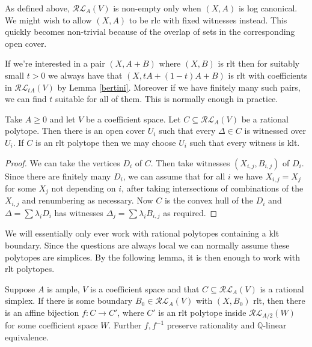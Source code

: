 	
	\begin{remark}
		
		As defined above, $\mathcal{RL}_{A}(V)$ is non-empty only when $(X,A)$ is log canonical. We might wish to allow $(X,A)$ to be rlc with fixed witnesses instead. This quickly becomes non-trivial because of the overlap of sets in the corresponding open cover.
		
		If we're interested in a pair $(X,A+B)$ where $(X,B)$ is rlt then for suitably small $t>0$ we always have that $(X,tA+(1-t)A+B)$ is rlt with coefficients in $\mathcal{RL}_{tA}(V)$ by Lemma \ref{bertini}. Moreover if we have finitely many such pairs, we can find $t$ suitable for all of them. This is normally enough in practice.
		
	\end{remark}
	
	\begin{lemma}
		Take $A \geq 0$ and let $V$ be a coefficient space. Let $C \subseteq \mathcal{RL}_{A}(V)$ be a rational polytope. Then there is an open cover $U_{i}$ such that every $\Delta \in C$ is witnessed over $U_{i}$. If $C$ is an rlt polytope then we may choose $U_{i}$ such that every witness is klt.
	\end{lemma}
	\begin{proof}
		We can take the vertices $D_{i}$ of $C$. Then take witnesses $(X_{i,j}, B_{i,j})$ of $D_{i}$. Since there are finitely many $D_{i}$, we can assume that for all $i$ we have $X_{i,j}=X_{j}$ for some $X_{j}$ not depending on $i$, after taking intersections of combinations of the $X_{i,j}$ and renumbering as necessary. Now $C$ is the convex hull of the $D_{i}$ and $\Delta= \sum \lambda_{i}D_{i}$ has witnesses $\Delta_{j}= \sum \lambda_{i}B_{i,j}$ as required.
	\end{proof}
	
	We will essentially only ever work with rational polytopes containing a klt boundary. Since the questions are always local we can normally assume these polytopes are simplices. By the following lemma, it is then enough to work with rlt polytopes.
	
	\begin{lemma}\label{rlt-repl}
		Suppose $A$ is ample, $V$ is a coefficient space and that $C\subseteq \mathcal{RL}_{A}(V)$ is a rational simplex. If there is some boundary $B_{0} \in \mathcal{RL}_{A}(V)$ with $(X,B_{0})$ rlt, then there is an affine bijection $f:C \to C'$, where $C'$ is an rlt polytope inside $\mathcal{RL}_{A/2}(W)$ for some coefficient space $W$. Further $f, f^{-1}$ preserve rationality and $\mathbb{Q}$-linear equivalence.
	\end{lemma}


